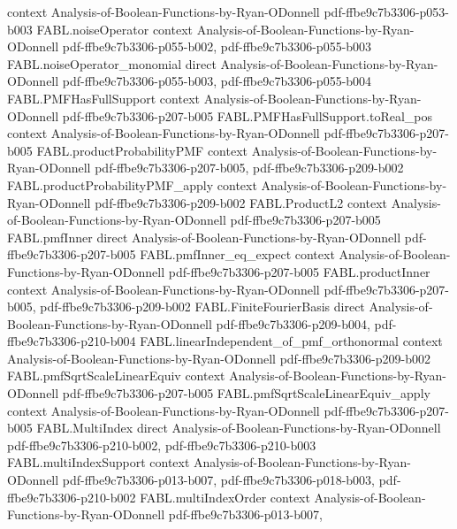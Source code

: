 \begin{theorem}
  {context}
  {Analysis-of-Boolean-Functions-by-Ryan-ODonnell}
  {pdf-ffbe9c7b3306-p053-b003}
\proofstep
  {FABL.noiseOperator}
  {context}
  {Analysis-of-Boolean-Functions-by-Ryan-ODonnell}
  {pdf-ffbe9c7b3306-p055-b002,
    pdf-ffbe9c7b3306-p055-b003}
\proofstep
  {FABL.noiseOperator_monomial}
  {direct}
  {Analysis-of-Boolean-Functions-by-Ryan-ODonnell}
  {pdf-ffbe9c7b3306-p055-b003,
    pdf-ffbe9c7b3306-p055-b004}
\proofstep
  {FABL.PMFHasFullSupport}
  {context}
  {Analysis-of-Boolean-Functions-by-Ryan-ODonnell}
  {pdf-ffbe9c7b3306-p207-b005}
\proofstep
  {FABL.PMFHasFullSupport.toReal_pos}
  {context}
  {Analysis-of-Boolean-Functions-by-Ryan-ODonnell}
  {pdf-ffbe9c7b3306-p207-b005}
\proofstep
  {FABL.productProbabilityPMF}
  {context}
  {Analysis-of-Boolean-Functions-by-Ryan-ODonnell}
  {pdf-ffbe9c7b3306-p207-b005,
    pdf-ffbe9c7b3306-p209-b002}
\proofstep
  {FABL.productProbabilityPMF_apply}
  {context}
  {Analysis-of-Boolean-Functions-by-Ryan-ODonnell}
  {pdf-ffbe9c7b3306-p209-b002}
\proofstep
  {FABL.ProductL2}
  {context}
  {Analysis-of-Boolean-Functions-by-Ryan-ODonnell}
  {pdf-ffbe9c7b3306-p207-b005}
\proofstep
  {FABL.pmfInner}
  {direct}
  {Analysis-of-Boolean-Functions-by-Ryan-ODonnell}
  {pdf-ffbe9c7b3306-p207-b005}
\proofstep
  {FABL.pmfInner_eq_expect}
  {context}
  {Analysis-of-Boolean-Functions-by-Ryan-ODonnell}
  {pdf-ffbe9c7b3306-p207-b005}
\proofstep
  {FABL.productInner}
  {context}
  {Analysis-of-Boolean-Functions-by-Ryan-ODonnell}
  {pdf-ffbe9c7b3306-p207-b005,
    pdf-ffbe9c7b3306-p209-b002}
\proofstep
  {FABL.FiniteFourierBasis}
  {direct}
  {Analysis-of-Boolean-Functions-by-Ryan-ODonnell}
  {pdf-ffbe9c7b3306-p209-b004,
    pdf-ffbe9c7b3306-p210-b004}
\proofstep
  {FABL.linearIndependent_of_pmf_orthonormal}
  {context}
  {Analysis-of-Boolean-Functions-by-Ryan-ODonnell}
  {pdf-ffbe9c7b3306-p209-b002}
\proofstep
  {FABL.pmfSqrtScaleLinearEquiv}
  {context}
  {Analysis-of-Boolean-Functions-by-Ryan-ODonnell}
  {pdf-ffbe9c7b3306-p207-b005}
\proofstep
  {FABL.pmfSqrtScaleLinearEquiv_apply}
  {context}
  {Analysis-of-Boolean-Functions-by-Ryan-ODonnell}
  {pdf-ffbe9c7b3306-p207-b005}
\proofstep
  {FABL.MultiIndex}
  {direct}
  {Analysis-of-Boolean-Functions-by-Ryan-ODonnell}
  {pdf-ffbe9c7b3306-p210-b002,
    pdf-ffbe9c7b3306-p210-b003}
\proofstep
  {FABL.multiIndexSupport}
  {context}
  {Analysis-of-Boolean-Functions-by-Ryan-ODonnell}
  {pdf-ffbe9c7b3306-p013-b007,
    pdf-ffbe9c7b3306-p018-b003,
    pdf-ffbe9c7b3306-p210-b002}
\proofstep
  {FABL.multiIndexOrder}
  {context}
  {Analysis-of-Boolean-Functions-by-Ryan-ODonnell}
  {pdf-ffbe9c7b3306-p013-b007,
}
\end{theorem}
